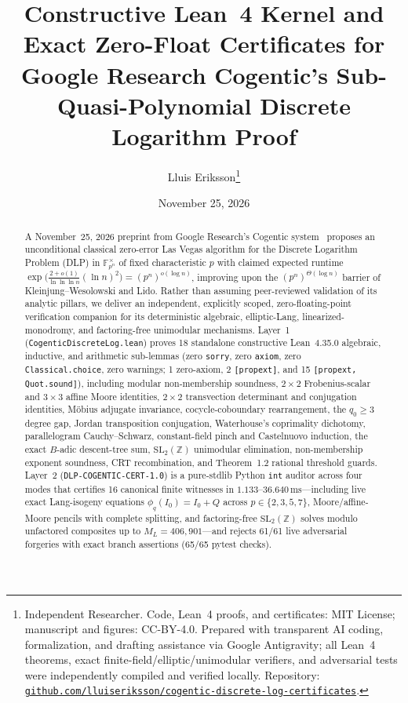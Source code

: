 \documentclass[10pt,twocolumn]{article}
\title{\vspace{-0.9em}\textbf{Constructive Lean~4 Kernel and Exact Zero-Float Certificates for Google Research Cogentic's Sub-Quasi-Polynomial Discrete Logarithm Proof}}
\author{Lluis Eriksson\thanks{Independent Researcher. Code, Lean~4 proofs, and certificates: MIT License; manuscript and figures: CC-BY-4.0. Prepared with transparent AI coding, formalization, and drafting assistance via Google Antigravity; all Lean~4 theorems, exact finite-field/elliptic/unimodular verifiers, and adversarial tests were independently compiled and verified locally. Repository: \href{https://github.com/lluiseriksson/cogentic-discrete-log-certificates}{\nolinkurl{github.com/lluiseriksson/cogentic-discrete-log-certificates}}.}}
\date{November 25, 2026}
\newcommand{\FF}{\mathbb{F}}
\newcommand{\ZZ}{\mathbb{Z}}
\begin{document}
\maketitle
\vspace{-1.2em}

\begin{abstract}
A November~25, 2026 preprint from Google Research's Cogentic system~\cite{cogentic2026dlp,cai2026cogentic} proposes an unconditional classical zero-error Las Vegas algorithm for the Discrete Logarithm Problem (DLP) in $\FF_{p^n}^\times$ of fixed characteristic $p$ with claimed expected runtime $\exp\bigl(\frac{2+o(1)}{\ln\ln\ln n}(\ln n)^2\bigr) = (p^n)^{o(\log n)}$, improving upon the $(p^n)^{\Theta(\log n)}$ barrier of Kleinjung--Wesolowski and Lido. Rather than assuming peer-reviewed validation of its analytic pillars, we deliver an independent, explicitly scoped, zero-floating-point verification companion for its deterministic algebraic, elliptic-Lang, linearized-monodromy, and factoring-free unimodular mechanisms. Layer~1 (\nolinkurl{CogenticDiscreteLog.lean}) proves 18 standalone constructive Lean~4.35.0 algebraic, inductive, and arithmetic sub-lemmas (zero \texttt{sorry}, zero \texttt{axiom}, zero \texttt{Classical.choice}, zero warnings; 1 zero-axiom, 2 \texttt{[propext]}, and 15 \texttt{[propext, Quot.sound]}), including modular non-membership soundness, $2{\times}2$ Frobenius-scalar and $3{\times}3$ affine Moore identities, $2{\times}2$ transvection determinant and conjugation identities, M\"obius adjugate invariance, cocycle-coboundary rearrangement, the $q_0\ge 3$ degree gap, Jordan transposition conjugation, Waterhouse's coprimality dichotomy, parallelogram Cauchy--Schwarz, constant-field pinch and Castelnuovo induction, the exact $B$-adic descent-tree sum, $\mathrm{SL}_2(\ZZ)$ unimodular elimination, non-membership exponent soundness, CRT recombination, and Theorem~1.2 rational threshold guards. Layer~2 (\nolinkurl{DLP-COGENTIC-CERT-1.0}) is a pure-stdlib Python \texttt{int} auditor across four modes that certifies 16 canonical finite witnesses in $1.133$--$36.640\,\mathrm{ms}$—including live exact Lang-isogeny equations $\phi_q(I_0)=I_0+Q$ across $p\in\{2,3,5,7\}$, Moore/affine-Moore pencils with complete splitting, and factoring-free $\mathrm{SL}_2(\ZZ)$ solves modulo unfactored composites up to $M_L = 406{,}901$—and rejects 61/61 live adversarial forgeries with exact branch assertions (65/65 pytest checks).
\end{abstract}
\end{document}

